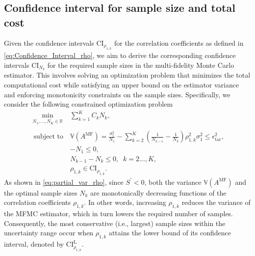\subsection{Confidence interval for sample size and total cost}
Given the confidence intervals $\text{CI}_{\rho_{1,k}}$ for the correlation coefficients as defined in \eqref{eq:Confidence_Interval_rho}, we aim to derive the corresponding confidence intervals $\text{CI}_{N_k}$ for the required sample sizes in the multi-fidelity Monte Carlo estimator. This involves solving an optimization problem that minimizes the total computational cost while satisfying an upper bound on the estimator variance and enforcing monotonicity constraints on the sample sizes. Specifically, we consider the following constrained optimization problem
%
\begin{equation}\label{eq:Optimization_pb_sample_size2}
    \begin{array}{ll}
    \min \limits_{\begin{array}{c}\scriptstyle N_1,\ldots, N_K\in \mathbb{R} \\[-4pt]
\end{array}} &\displaystyle\sum\limits_{k=1}^K C_kN_k,\\
       \;\,\text{subject to} &\mathbb{V}\left(A^{\text{MF}}\right)=\frac{\sigma_1^2}{N_1} - \sum_{k=2}^K \left(\frac{1}{N_{k-1}} - \frac{1}{N_k}\right)\rho_{1,k}^2\sigma_1^2\le   \epsilon_{\text{tar}}^2,\\[2pt]
       &\displaystyle -N_1\le 0,\\
        &\displaystyle N_{k-1}-N_k\le 0, \;\; k=2\ldots,K,\\
        & \rho_{1,k}\in \text{CI}_{\rho_{1,k}}.
    \end{array}
\end{equation}
%
As shown in \eqref{eq:partial_var_rho}, since $S^\prime<0$, both the variance $\mathbb{V}(A^{\text{MF}})$ and the optimal sample sizes $N_k$ are monotonically decreasing functions of the correlation coefficients $\rho_{1,k}$. In other words, increasing $\rho_{1,k}$ reduces the variance of the MFMC estimator, which in turn lowers the required number of samples. Consequently, the most conservative (i.e., largest) sample sizes within the uncertainty range occur when $\rho_{1,k}$ attains the lower bound of its confidence interval, denoted by $\text{CI}_{\rho_{1,k}}^{\text{L}}$.

